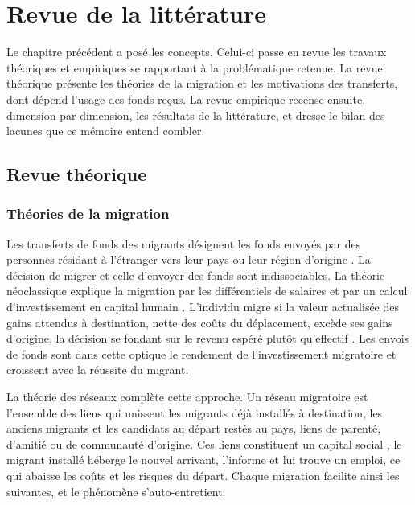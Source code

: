 \section{Revue de la littérature}
\label{sec:revue}

Le chapitre précédent a posé les concepts. Celui-ci passe en revue les travaux
théoriques et empiriques se rapportant à la problématique retenue. La revue
théorique présente les théories de la migration et les motivations des
transferts, dont dépend l'usage des fonds reçus. La revue empirique recense
ensuite, dimension par dimension, les résultats de la littérature, et dresse le
bilan des lacunes que ce mémoire entend combler.

\subsection{Revue théorique}

\subsubsection{Théories de la migration}

Les transferts de fonds des migrants désignent les fonds envoyés par des
personnes résidant à l'étranger vers leur pays ou leur région d'origine
\parencite{maimbo2005}. La décision de migrer et celle d'envoyer des fonds sont indissociables. La
théorie néoclassique explique la migration par les différentiels de salaires et
par un calcul d'investissement en capital humain \parencite{sjaastad1962}.
L'individu migre si la valeur actualisée des gains attendus à destination,
nette des coûts du déplacement, excède ses gains d'origine, la décision se
fondant sur le revenu espéré plutôt qu'effectif \parencite{harris1970}.
Les envois de fonds sont dans cette optique le rendement de l'investissement
migratoire et croissent avec la réussite du migrant.

La théorie des réseaux \parencite{massey1993} complète cette approche. Un
réseau migratoire est l'ensemble des liens qui unissent les migrants déjà
installés à destination, les anciens migrants et les candidats au départ
restés au pays, liens de parenté, d'amitié ou de communauté d'origine.
Ces liens constituent un capital social \parencite{bourdieu1986}, le
migrant installé héberge le nouvel arrivant, l'informe et lui trouve un
emploi, ce qui abaisse les coûts et les risques du départ. Chaque migration
facilite ainsi les suivantes, et le phénomène s'auto-entretient.

